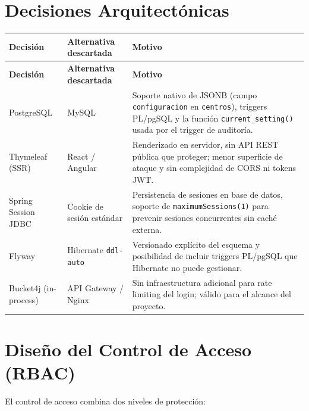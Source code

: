 \documentclass[12pt, a4paper]{report}
\begin{document}
\section{Decisiones Arquitectónicas}

\begin{longtable}{p{2.8cm} p{3.2cm} p{6.2cm}}
  \toprule
  \textbf{Decisión} & \textbf{Alternativa descartada} & \textbf{Motivo} \\
  \midrule
  \endfirsthead
  \toprule
  \textbf{Decisión} & \textbf{Alternativa descartada} & \textbf{Motivo} \\
  \midrule
  \endhead
  \bottomrule
  \endfoot
  PostgreSQL & MySQL & Soporte nativo de JSONB (campo \texttt{configuracion} en
                       \texttt{centros}), triggers PL/pgSQL y la función
                       \texttt{current\_setting()} usada por el trigger de
                       auditoría. \\[4pt]
  Thymeleaf (SSR) & React / Angular & Renderizado en servidor, sin API REST pública
                       que proteger; menor superficie de ataque y sin complejidad
                       de CORS ni tokens JWT. \\[4pt]
  Spring Session JDBC & Cookie de sesión estándar & Persistencia de sesiones en
                       base de datos, soporte de \texttt{maximumSessions(1)} para
                       prevenir sesiones concurrentes sin caché externa. \\[4pt]
  Flyway & Hibernate \texttt{ddl-auto} & Versionado explícito del esquema y
                       posibilidad de incluir triggers PL/pgSQL que Hibernate no
                       puede gestionar. \\[4pt]
  Bucket4j (in-process) & API Gateway / Nginx & Sin infraestructura adicional para
                       rate limiting del login; válido para el alcance del proyecto. \\
\end{longtable}

\section{Diseño del Control de Acceso (RBAC)}

El control de acceso combina dos niveles de protección:
\end{document}
